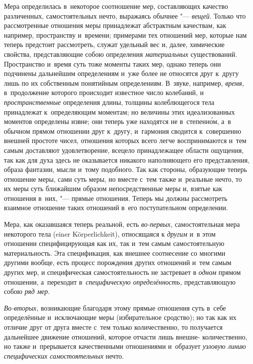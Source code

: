 Мера определилась в~некоторое соотношение мер, составляющих качество
различенных, самостоятельных нечто, выражаясь обычнее "--- {\em вещей}.
Только что рассмотренные отношения меры принадлежат абстрактным качествам, как
например, пространству и~времени; примерами тех отношений мер, которые нам
теперь предстоит рассмотреть, служат удельный вес и, далее, химические
свойства, представляющие собою определения {\em материальных} существований.
Пространство и~время суть тоже моменты таких мер, однако теперь они подчинены
дальнейшим определениям и~уже более не относятся друг к~другу лишь по их
собственным понятийным определениям. В~звуке, например, {\em время,}
в~продолжение которого происходит известное число колебаний,
и {\em пространственные} определения длины, толщины колеблющегося тела
принадлежат к~определяющим моментам; но величины этих идеализованных моментов
определены извне; они теперь уже находятся не в~степенн\'{о}м, а~в обычном
прямом отношении друг к~другу, и~гармония сводится к~совершенно внешней
простоте чисел, отношения которых всего легче воспринимаются и~тем самым
доставляют удовлетворение, всецело принадлежащее области ощущения, так как для
духа здесь не оказывается никакого наполняющего его представления, образа
фантазии, мысли и~тому подобного. Так как стороны, образующие теперь отношение
меры, сами суть меры, но вместе с~тем также и~реальные нечто, то их меры суть
ближайшим образом непосредственные меры и, взятые как отношения в~них, "---
прямые отношения. Теперь мы должны рассмотреть взаимное отношение таких
отношений в~его поступательном определении.

Мера, как оказавшаяся теперь реальной, есть {\em во-первых,} самостоятельная
мера некоторого тела (einer Körper\-lich\-keit), относящаяся к {\em другим} и~в
этом отношении специфицирующая как их, так и~тем самым самостоятельную
материальность. Эта спецификация, как внешнее соотнесение со многими другими
вообще, есть процесс порождения других отношений и~тем самым других мер, и
специфическая самостоятельность не застревает в {\em одном} прямом отношении,
а~переходит в~{\em специфическую определённость,} представляющую собою
{\em ряд мер}.

{\em Во-вторых,} возникающие благодаря этому прямые отношения суть в~себе
определённые и~исключающие меры (избирательное сродство); но так как их отличие
друг от друга вместе с~тем только количественно, то получается дальнейшее
движение отношений, которое отчасти лишь внешне- количественно, но также
и~прерывается качественными отношениями и~образует {\em узловую линию
специфических самостоятельных} нечто.

